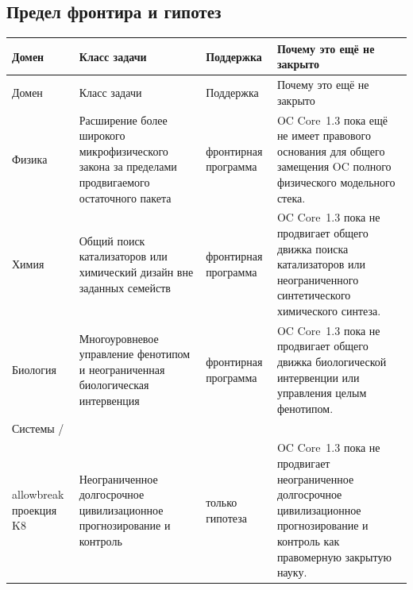 \subsection{Предел фронтира и гипотез}
\begin{longtable}{@{}L{0.11\textwidth}L{0.19\textwidth}L{0.14\textwidth}L{0.48\textwidth}@{}}
\toprule
Домен & Класс задачи & Поддержка & Почему это ещё не закрыто \\
\midrule
\endfirsthead
\toprule
Домен & Класс задачи & Поддержка & Почему это ещё не закрыто \\
\midrule
\endhead
Физика & Расширение более широкого микрофизического закона за пределами продвигаемого остаточного пакета & фронтирная программа & OC Core~1.3 пока ещё не имеет правового основания для общего замещения OC полного физического модельного стека. \\
Химия & Общий поиск катализаторов или химический дизайн вне заданных семейств & фронтирная программа & OC Core~1.3 пока не продвигает общего движка поиска катализаторов или неограниченного синтетического химического синтеза. \\
Биология & Многоуровневое управление фенотипом и неограниченная биологическая интервенция & фронтирная программа & OC Core~1.3 пока не продвигает общего движка биологической интервенции или управления целым фенотипом. \\
Системы /\\allowbreak проекция K8 & Неограниченное долгосрочное цивилизационное прогнозирование и контроль & только гипотеза & OC Core~1.3 пока не продвигает неограниченное долгосрочное цивилизационное прогнозирование и контроль как правомерную закрытую науку. \\
\bottomrule
\end{longtable}
\endgroup









